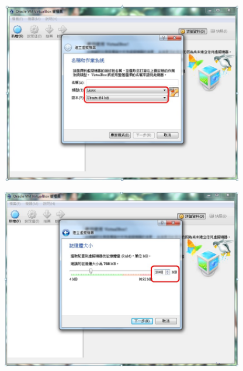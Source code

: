 \documentclass{article}
\begin{document}
\begin{figure}[htp]
    \begin{center}
        \includegraphics[width=300pt]{pic/圖片3.jpg}
    \end{center}
\end{figure}

\begin{figure}[htp]
    \begin{center}
        \includegraphics[width=300pt]{pic/圖片4.jpg}
    \end{center}
\end{figure}
\end{document}
